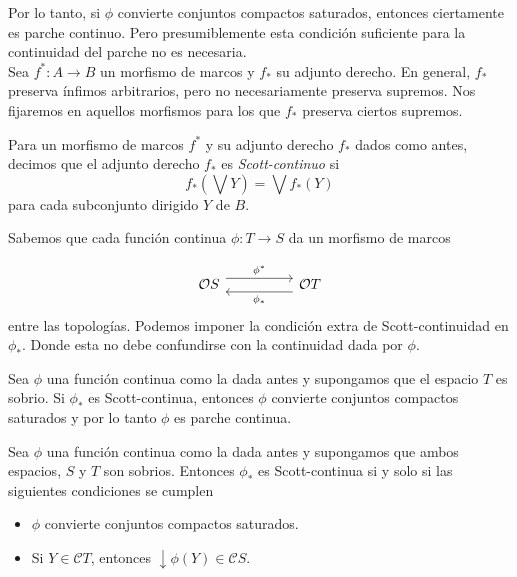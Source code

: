Por lo tanto, si $\phi$ convierte conjuntos compactos saturados, entonces ciertamente es parche continuo. Pero presumiblemente esta condición suficiente para la continuidad del parche no es necesaria.\\

Sea $f^*\colon A\to B$ un morfismo de marcos y $f_*$ su adjunto derecho. En general, $f_*$ preserva ínfimos arbitrarios, pero no necesariamente preserva supremos. Nos fijaremos en aquellos morfismos para los que $f_*$ preserva ciertos supremos.\\

\begin{dfn}\label{Scottcontino}
    Para un morfismo de marcos $f^*$ y su adjunto derecho $f_*$ dados como antes, decimos que el adjunto derecho $f_*$ es \emph{Scott-continuo} si 
    \[
    f_*(\bigvee Y)=\bigvee f_*(Y)
    \]
    para cada subconjunto dirigido $Y$ de $B$.
\end{dfn}

Sabemos que cada función continua $\phi\colon T\to S$ da un morfismo de marcos 

\[\begin{tikzcd}
	{\mathcal{O}S} && {\mathcal{O}T}
	\arrow["{\phi^*}", shift left=2, from=1-1, to=1-3]
	\arrow["{\phi_*}", shift left=2, from=1-3, to=1-1]
\end{tikzcd}\]
entre las topologías. Podemos imponer la condición extra de Scott-continuidad en $\phi_*$. Donde esta no debe confundirse con la continuidad dada por $\phi$.

\begin{lem}\label{Pcontinua y Scontinua}
    Sea $\phi$ una función continua como la dada antes y supongamos que el espacio $T$ es sobrio. Si $\phi_*$ es Scott-continua, entonces $\phi$ convierte conjuntos compactos saturados y por lo tanto $\phi$ es parche continua.
\end{lem}

\begin{thm}
    Sea $\phi$ una función continua como la dada antes y supongamos que ambos espacios, $S$ y $T$ son sobrios. Entonces $\phi_*$ es Scott-continua si y solo si las siguientes condiciones se cumplen
    \begin{itemize}
        \item $\phi$ convierte conjuntos compactos saturados.
        \item Si $Y\in \mathcal{C}T$, entonces $\downarrow \phi(Y)\in \mathcal{C}S$.
    \end{itemize}
\end{thm}

